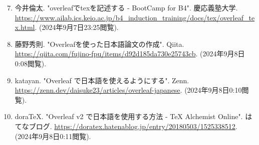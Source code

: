 \documentclass[10pt,a4paper]{jsarticle}
\begin{document}
\begin{enumerate}
    \setcounter{enumi}{6}
    \renewcommand{\labelenumi}{[\arabic{enumi}]\ }
    \item 今井倫太. "overleafでtexを記述する - BootCamp for B4". 慶応義塾大学. \url{https://www.ailab.ics.keio.ac.jp/b4_induction_training/docs/tex/overleaf_tex.html}. (2024年9月7日23:25閲覧). 
    \setcounter{enumi}{8}
    \item 藤野秀則. "Overleafを使った日本語論文の作成". Qiita. \url{https://qiita.com/fujino-fpu/items/d92d185da730e25743cb}. (2024年9月8日0:08閲覧). 
    \item katayan. "Overleaf で日本語を使えるようにする". Zenn. \url{https://zenn.dev/daisuke23/articles/overleaf-japanese}. (2024年9月8日0:10閲覧). 
    \item doraTeX. "Overleaf v2 で日本語を使用する方法 - TeX Alchemist Online". はてなブログ. \url{https://doratex.hatenablog.jp/entry/20180503/1525338512}. (2024年9月8日0:11閲覧). 
\end{enumerate}
\end{document}
